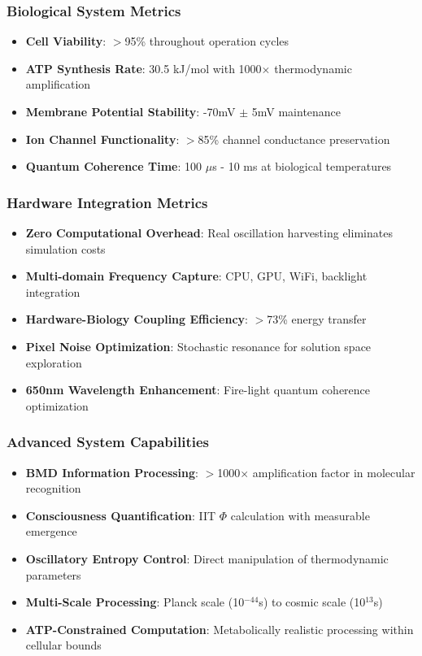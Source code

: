 \documentclass[11pt,a4paper]{article}
\begin{document}
\subsubsection{Biological System Metrics}
\begin{itemize}
\item \textbf{Cell Viability}: $>$95\% throughout operation cycles
\item \textbf{ATP Synthesis Rate}: 30.5 kJ/mol with 1000$\times$ thermodynamic amplification
\item \textbf{Membrane Potential Stability}: -70mV $\pm$ 5mV maintenance
\item \textbf{Ion Channel Functionality}: $>$85\% channel conductance preservation
\item \textbf{Quantum Coherence Time}: 100 $\mu$s - 10 ms at biological temperatures
\end{itemize}

\subsubsection{Hardware Integration Metrics}
\begin{itemize}
\item \textbf{Zero Computational Overhead}: Real oscillation harvesting eliminates simulation costs
\item \textbf{Multi-domain Frequency Capture}: CPU, GPU, WiFi, backlight integration
\item \textbf{Hardware-Biology Coupling Efficiency}: $>$73\% energy transfer
\item \textbf{Pixel Noise Optimization}: Stochastic resonance for solution space exploration
\item \textbf{650nm Wavelength Enhancement}: Fire-light quantum coherence optimization
\end{itemize}

\subsubsection{Advanced System Capabilities}
\begin{itemize}
\item \textbf{BMD Information Processing}: $>$1000$\times$ amplification factor in molecular recognition
\item \textbf{Consciousness Quantification}: IIT $\Phi$ calculation with measurable emergence
\item \textbf{Oscillatory Entropy Control}: Direct manipulation of thermodynamic parameters
\item \textbf{Multi-Scale Processing}: Planck scale (10$^{-44}$s) to cosmic scale (10$^{13}$s)
\item \textbf{ATP-Constrained Computation}: Metabolically realistic processing within cellular bounds
\end{itemize}
\end{document}
